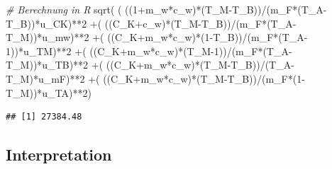 \documentclass[
  9pt,
]{article}
\newenvironment{Shaded}{\begin{snugshade}}{\end{snugshade}}
\newcommand{\CommentTok}[1]{\textcolor[rgb]{0.56,0.35,0.01}{\textit{#1}}}
\newcommand{\DecValTok}[1]{\textcolor[rgb]{0.00,0.00,0.81}{#1}}
\newcommand{\FunctionTok}[1]{\textcolor[rgb]{0.00,0.00,0.00}{#1}}
\newcommand{\NormalTok}[1]{#1}
\newcommand{\SpecialCharTok}[1]{\textcolor[rgb]{0.00,0.00,0.00}{#1}}
\begin{document}
\begin{Shaded}
\begin{Highlighting}[]
\CommentTok{\# Berechnung in R}
\FunctionTok{sqrt}\NormalTok{( ( ((}\DecValTok{1}\SpecialCharTok{+}\NormalTok{m\_w}\SpecialCharTok{*}\NormalTok{c\_w)}\SpecialCharTok{*}\NormalTok{(T\_M}\SpecialCharTok{{-}}\NormalTok{T\_B))}\SpecialCharTok{/}\NormalTok{(m\_F}\SpecialCharTok{*}\NormalTok{(T\_A}\SpecialCharTok{{-}}\NormalTok{T\_B))}\SpecialCharTok{*}\NormalTok{u\_CK)}\SpecialCharTok{**}\DecValTok{2}
     \SpecialCharTok{+}\NormalTok{( ((C\_K}\SpecialCharTok{+}\NormalTok{c\_w)}\SpecialCharTok{*}\NormalTok{(T\_M}\SpecialCharTok{{-}}\NormalTok{T\_B))}\SpecialCharTok{/}\NormalTok{(m\_F}\SpecialCharTok{*}\NormalTok{(T\_A}\SpecialCharTok{{-}}\NormalTok{T\_M))}\SpecialCharTok{*}\NormalTok{u\_mw)}\SpecialCharTok{**}\DecValTok{2}
     \SpecialCharTok{+}\NormalTok{( ((C\_K}\SpecialCharTok{+}\NormalTok{m\_w}\SpecialCharTok{*}\NormalTok{c\_w)}\SpecialCharTok{*}\NormalTok{(}\DecValTok{1}\SpecialCharTok{{-}}\NormalTok{T\_B))}\SpecialCharTok{/}\NormalTok{(m\_F}\SpecialCharTok{*}\NormalTok{(T\_A}\DecValTok{{-}1}\NormalTok{))}\SpecialCharTok{*}\NormalTok{u\_TM)}\SpecialCharTok{**}\DecValTok{2}
     \SpecialCharTok{+}\NormalTok{( ((C\_K}\SpecialCharTok{+}\NormalTok{m\_w}\SpecialCharTok{*}\NormalTok{c\_w)}\SpecialCharTok{*}\NormalTok{(T\_M}\DecValTok{{-}1}\NormalTok{))}\SpecialCharTok{/}\NormalTok{(m\_F}\SpecialCharTok{*}\NormalTok{(T\_A}\SpecialCharTok{{-}}\NormalTok{T\_M))}\SpecialCharTok{*}\NormalTok{u\_TB)}\SpecialCharTok{**}\DecValTok{2}
     \SpecialCharTok{+}\NormalTok{( ((C\_K}\SpecialCharTok{+}\NormalTok{m\_w}\SpecialCharTok{*}\NormalTok{c\_w)}\SpecialCharTok{*}\NormalTok{(T\_M}\SpecialCharTok{{-}}\NormalTok{T\_B))}\SpecialCharTok{/}\NormalTok{(T\_A}\SpecialCharTok{{-}}\NormalTok{T\_M)}\SpecialCharTok{*}\NormalTok{u\_mF)}\SpecialCharTok{**}\DecValTok{2}
     \SpecialCharTok{+}\NormalTok{( ((C\_K}\SpecialCharTok{+}\NormalTok{m\_w}\SpecialCharTok{*}\NormalTok{c\_w)}\SpecialCharTok{*}\NormalTok{(T\_M}\SpecialCharTok{{-}}\NormalTok{T\_B))}\SpecialCharTok{/}\NormalTok{(m\_F}\SpecialCharTok{*}\NormalTok{(}\DecValTok{1}\SpecialCharTok{{-}}\NormalTok{T\_M))}\SpecialCharTok{*}\NormalTok{u\_TA)}\SpecialCharTok{**}\DecValTok{2}\NormalTok{)}
\end{Highlighting}
\end{Shaded}

\begin{verbatim}
## [1] 27384.48
\end{verbatim}

\hypertarget{interpretation}{%
\subsection{Interpretation}\label{interpretation}}
\end{document}
